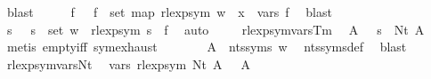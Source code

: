 \begin{isabellebody}
\ blast\isanewline
\ \ \isamarkupfalse%
\ \isamarkupfalse%
\ f\ \ {\isacharasterisk}{\kern0pt}{\isacharcolon}{\kern0pt}\ {\isachardoublequoteopen}f\ {\isasymin}\ set\ {\isacharparenleft}{\kern0pt}map\ rlexp{\isacharunderscore}{\kern0pt}sym\ w{\isacharparenright}{\kern0pt}\ {\isasymand}\ x\ {\isasymin}\ vars\ f{\isachardoublequoteclose}\ \isamarkupfalse%
\ blast\isanewline
\ \ \isamarkupfalse%
\ \isamarkupfalse%
\ s\ \ {\isacharasterisk}{\kern0pt}{\isacharasterisk}{\kern0pt}{\isacharcolon}{\kern0pt}\ {\isachardoublequoteopen}s\ {\isasymin}\ set\ w\ {\isasymand}\ rlexp{\isacharunderscore}{\kern0pt}sym\ s\ {\isacharequal}{\kern0pt}\ f{\isachardoublequoteclose}\ \isamarkupfalse%
\ auto\isanewline
\ \ \isamarkupfalse%
\ {\isacharasterisk}{\kern0pt}\ rlexp{\isacharunderscore}{\kern0pt}sym{\isacharunderscore}{\kern0pt}vars{\isacharunderscore}{\kern0pt}Tm\ \isamarkupfalse%
\ A\ \ {\isacharasterisk}{\kern0pt}{\isacharasterisk}{\kern0pt}{\isacharasterisk}{\kern0pt}{\isacharcolon}{\kern0pt}\ {\isachardoublequoteopen}s\ {\isacharequal}{\kern0pt}\ Nt\ A{\isachardoublequoteclose}\ \isamarkupfalse%
\ {\isacharparenleft}{\kern0pt}metis\ empty{\isacharunderscore}{\kern0pt}iff\ sym{\isachardot}{\kern0pt}exhaust{\isacharparenright}{\kern0pt}\isanewline
\ \ \isamarkupfalse%
\ {\isacharasterisk}{\kern0pt}{\isacharasterisk}{\kern0pt}\ \isamarkupfalse%
\ {\isacharasterisk}{\kern0pt}{\isacharasterisk}{\kern0pt}{\isacharasterisk}{\kern0pt}{\isacharasterisk}{\kern0pt}{\isacharcolon}{\kern0pt}\ {\isachardoublequoteopen}A\ {\isasymin}\ nts{\isacharunderscore}{\kern0pt}syms\ w{\isachardoublequoteclose}\ \isamarkupfalse%
\ nts{\isacharunderscore}{\kern0pt}syms{\isacharunderscore}{\kern0pt}def\ \isamarkupfalse%
\ blast\isanewline
\ \ \isamarkupfalse%
\ rlexp{\isacharunderscore}{\kern0pt}sym{\isacharunderscore}{\kern0pt}vars{\isacharunderscore}{\kern0pt}Nt\ \isamarkupfalse%
\ {\isachardoublequoteopen}vars\ {\isacharparenleft}{\kern0pt}rlexp{\isacharunderscore}{\kern0pt}sym\ {\isacharparenleft}{\kern0pt}Nt\ A{\isacharparenright}{\kern0pt}{\isacharparenright}{\kern0pt}\ {\isacharequal}{\kern0pt}\ {\isacharbraceleft}{\kern0pt}{\isasymgamma}{\isacharprime}{\kern0pt}\ A{\isacharbraceright}{\kern0pt}{\isachardoublequoteclose}\ \isamarkupfalse%

\end{isabellebody}
